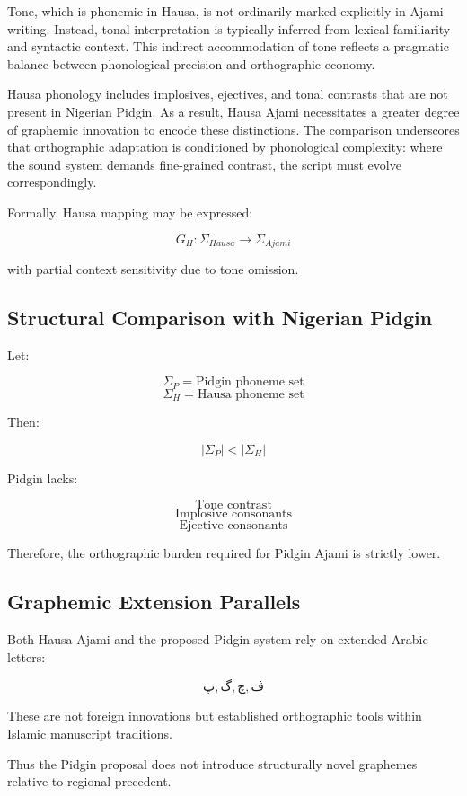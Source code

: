 \documentclass[12pt]{article}
\begin{document}
Tone, which is phonemic in Hausa, is not ordinarily marked explicitly in Ajami writing. Instead, tonal interpretation is typically inferred from lexical familiarity and syntactic context. This indirect accommodation of tone reflects a pragmatic balance between phonological precision and orthographic economy.

Hausa phonology includes implosives, ejectives, and tonal contrasts that are not present in Nigerian Pidgin. As a result, Hausa Ajami necessitates a greater degree of graphemic innovation to encode these distinctions. The comparison underscores that orthographic adaptation is conditioned by phonological complexity: where the sound system demands fine-grained contrast, the script must evolve correspondingly.

Formally, Hausa mapping may be expressed:

\[
G_H : \Sigma_{Hausa} \rightarrow \Sigma_{Ajami}
\]

with partial context sensitivity due to tone omission.

\subsection{Structural Comparison with Nigerian Pidgin}

Let:

\[
\Sigma_P = \text{Pidgin phoneme set}
\]
\[
\Sigma_H = \text{Hausa phoneme set}
\]

Then:

\[
|\Sigma_P| < |\Sigma_H|
\]

Pidgin lacks:

\[
\text{Tone contrast}
\]
\[
\text{Implosive consonants}
\]
\[
\text{Ejective consonants}
\]

Therefore, the orthographic burden required for Pidgin Ajami is strictly lower.

\subsection{Graphemic Extension Parallels}

Both Hausa Ajami and the proposed Pidgin system rely on extended Arabic letters:

\[
پ, گ, چ, ڤ
\]

These are not foreign innovations but established orthographic tools within Islamic manuscript traditions.

Thus the Pidgin proposal does not introduce structurally novel graphemes relative to regional precedent.
\end{document}
